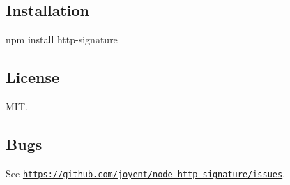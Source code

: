 \subsection*{Installation}

\begin{DoxyVerb}npm install http-signature
\end{DoxyVerb}


\subsection*{License}

M\+IT.

\subsection*{Bugs}

See \href{https://github.com/joyent/node-http-signature/issues}{\tt https\+://github.\+com/joyent/node-\/http-\/signature/issues}. 